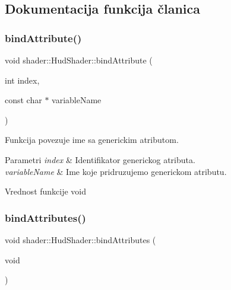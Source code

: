 \subsection{Dokumentacija funkcija članica}
\mbox{\label{classshader_1_1HudShader_acb1e2f4627e7ca8b1ad7510ecc0e1365}} 
\subsubsection{\texorpdfstring{bind\+Attribute()}{bindAttribute()}}
{\footnotesize\ttfamily void shader\+::\+Hud\+Shader\+::bind\+Attribute (\begin{DoxyParamCaption}\item[{int}]{index,  }\item[{const char $\ast$}]{variable\+Name }\end{DoxyParamCaption})}



Funkcija povezuje ime sa generickim atributom. 


\begin{DoxyParams}{Parametri}
{\em index} & Identifikator generickog atributa. \\
\hline
{\em variable\+Name} & Ime koje pridruzujemo generickom atributu. \\
\hline
\end{DoxyParams}
\begin{DoxyReturn}{Vrednost funkcije}
void 
\end{DoxyReturn}
\mbox{\label{classshader_1_1HudShader_a56b7babc788d444c185cd702f97a324c}} 
\subsubsection{\texorpdfstring{bind\+Attributes()}{bindAttributes()}}
{\footnotesize\ttfamily void shader\+::\+Hud\+Shader\+::bind\+Attributes (\begin{DoxyParamCaption}\item[{void}]{ }\end{DoxyParamCaption})}



